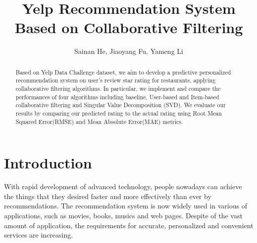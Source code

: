 \documentclass{llncs}
\begin{document}
%
\frontmatter          %
%
\pagestyle{headings}  %


%

%
\mainmatter              %
%
\title{Yelp Recommendation System Based on Collaborative Filtering}
%
%
\author{Sainan He, Jiaoyang Fu, Yameng Li}
%
%
%

\maketitle              %

\begin{abstract}

Based on Yelp Data Challenge dataset, we aim to develop a predictive personalized recommendation system on user’s review star rating for restaurants, applying collaborative filtering algorithms. In particular, we implement and compare the performances of four algorithms including baseline, User-based and Item-based collaborative filtering and Singular Value Decomposition (SVD). We evaluate our results by comparing our predicted rating to the actual rating using Root Mean Squared Error(RMSE) and Mean Absolute Error(MAE) metrics.

\end{abstract}

\section{Introduction}
With rapid development of advanced technology, people nowadays can achieve the things that they desired faster and more effectively than ever by recommendations. The recommendation system is now widely used in various of applications, such as movies, books, musics and web pages. Despite of the vast amount of application, the requirements for accurate, personalized and convenient services are increasing. 
\end{document}
